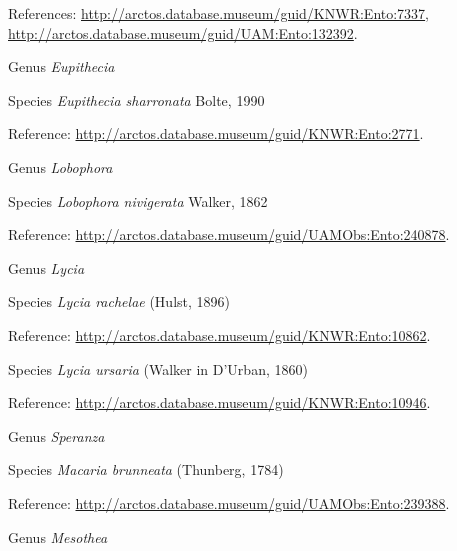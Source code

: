 \documentclass[9pt, article]{memoir}
\begin{document}
\begin{multicols}{2}
References: 
\url{http://arctos.database.museum/guid/KNWR:Ento:7337}, 
\url{http://arctos.database.museum/guid/UAM:Ento:132392}.

\vspace{6pt}\noindent\hspace{30pt}Genus \textit{Eupithecia}


\vspace{6pt}\noindent\hspace{36pt}Species \textit{Eupithecia sharronata} Bolte, 1990


Reference: 
\url{http://arctos.database.museum/guid/KNWR:Ento:2771}.

\vspace{6pt}\noindent\hspace{30pt}Genus \textit{Lobophora}


\vspace{6pt}\noindent\hspace{36pt}Species \textit{Lobophora nivigerata} Walker, 1862


Reference: 
\url{http://arctos.database.museum/guid/UAMObs:Ento:240878}.

\vspace{6pt}\noindent\hspace{30pt}Genus \textit{Lycia}


\vspace{6pt}\noindent\hspace{36pt}Species \textit{Lycia rachelae} (Hulst, 1896)


Reference: 
\url{http://arctos.database.museum/guid/KNWR:Ento:10862}.

\vspace{6pt}\noindent\hspace{36pt}Species \textit{Lycia ursaria} (Walker in D'Urban, 1860)


Reference: 
\url{http://arctos.database.museum/guid/KNWR:Ento:10946}.

\vspace{6pt}\noindent\hspace{30pt}Genus \textit{Speranza}


\vspace{6pt}\noindent\hspace{36pt}Species \textit{Macaria brunneata} (Thunberg, 1784)


Reference: 
\url{http://arctos.database.museum/guid/UAMObs:Ento:239388}.

\vspace{6pt}\noindent\hspace{30pt}Genus \textit{Mesothea}



\end{multicols}
\end{document}
